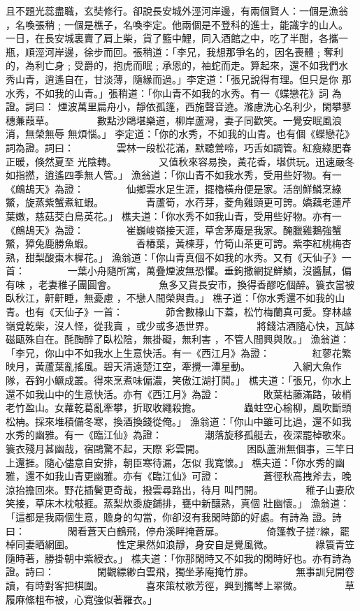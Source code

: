 \begin{pinyinscope}
{且不題光蕊盡職，玄奘修行。卻說長安城外涇河岸邊，有兩個賢人：一個是漁翁
，名喚張稍﹔一個是樵子，名喚李定。他兩個是不登科的進士，能識字的山人。
一日，在長安城裏賣了肩上柴，貨了籃中鯉，同入酒館之中，吃了半酣，各攜一
瓶，順涇河岸邊，徐步而回。張稍道：「李兄，我想那爭名的，因名喪體﹔奪利
的，為利亡身﹔受爵的，抱虎而眠﹔承恩的，袖蛇而走。算起來，還不如我們水
秀山青，逍遙自在，甘淡薄，隨緣而過。」李定道：「張兄說得有理。但只是你
那水秀，不如我的山青。」張稍道：「你山青不如我的水秀。有一《蝶戀花》詞
為證。詞曰：
煙波萬里扁舟小，靜依孤篷，西施聲音遶。滌慮洗心名利少，閑攀蓼穗蒹葭草。
　　　　數點沙鷗堪樂道，柳岸蘆灣，妻子同歡笑。一覺安眠風浪消，無榮無辱
        無煩惱。」
李定道：「你的水秀，不如我的山青。也有個《蝶戀花》詞為證。詞曰：
　　　　雲林一段松花滿，默聽鶯啼，巧舌如調管。紅瘦綠肥春正暖，倏然夏至
        光陰轉。
　　　　又值秋來容易換，黃花香，堪供玩。迅速嚴冬如指撚，逍遙四季無人管。」
漁翁道：「你山青不如我水秀，受用些好物。有一《鷓鴣天》為證：
　　　　仙鄉雲水足生涯，擺櫓橫舟便是家。活剖鮮鱗烹綠鱉，旋蒸紫蟹煮紅蝦。
　　　　青蘆筍，水荇芽，菱角雞頭更可誇。嬌藕老蓮芹葉嫩，慈菇茭白鳥英花。」
樵夫道：「你水秀不如我山青，受用些好物。亦有一《鷓鴣天》為證：
　　　　崔巍峻嶺接天涯，草舍茅庵是我家。醃臘雞鵝強蟹鱉，獐兔鹿勝魚蝦。
　　　　香椿葉，黃楝芽，竹筍山茶更可誇。紫李紅桃梅杏熟，甜梨酸棗木樨花。」
漁翁道：「你山青真個不如我的水秀。又有《天仙子》一首：
　　　　一葉小舟隨所寓，萬疊煙波無恐懼。垂鉤撒網捉鮮鱗，沒醬膩，偏有味
       ，老妻稚子團圓會。
　　　　魚多又貨長安市，換得香醪吃個醉。簑衣當被臥秋江，鼾鼾睡，無憂慮
       ，不戀人間榮與貴。」
樵子道：「你水秀還不如我的山青。也有《天仙子》一首：
　　　　茆舍數椽山下蓋，松竹梅蘭真可愛。穿林越嶺覓乾柴，沒人怪，從我賣
       ，或少或多憑世界。
　　　　將錢沽酒隨心快，瓦缽磁甌殊自在。酕醄醉了臥松陰，無掛礙，無利害
       ，不管人間興與敗。」
漁翁道：「李兄，你山中不如我水上生意快活。有一《西江月》為證：
　　　　紅蓼花繁映月，黃蘆葉亂搖風。碧天清遠楚江空，牽攪一潭星動。
　　　　入網大魚作隊，吞鉤小鱖成叢。得來烹煮味偏濃，笑傲江湖打鬨。」
樵夫道：「張兄，你水上還不如我山中的生意快活。亦有《西江月》為證：
　　　　敗葉枯藤滿路，破梢老竹盈山。女蘿乾葛亂牽攀，折取收繩殺擔。
　　　　蟲蛀空心榆柳，風吹斷頭松柟。採來堆積備冬寒，換酒換錢從俺。」
漁翁道：「你山中雖可比過，還不如我水秀的幽雅。有一《臨江仙》為證：
　　　　潮落旋移孤艇去，夜深罷棹歌來。簑衣殘月甚幽哉，宿鷗驚不起，天際
彩雲開。
　　　　困臥蘆洲無個事，三竿日上還捱。隨心儘意自安排，朝臣寒待漏，怎似
        我寬懷。」
樵夫道：「你水秀的幽雅，還不如我山青更幽雅。亦有《臨江仙》可證：
　　　　蒼徑秋高拽斧去，晚涼抬擔回來。野花插鬢更奇哉，撥雲尋路出，待月
        叫門開。
　　　　稚子山妻欣笑接，草床木枕攲捱。蒸梨炊黍旋鋪排，甕中新釀熟，真個
        壯幽懷。」
漁翁道：「這都是我兩個生意，贍身的勾當，你卻沒有我閑時節的好處。有詩為
        證。詩曰：
　　　　閑看蒼天白鶴飛，停舟溪畔掩蒼扉。
　　　　倚篷教子搓?線，罷棹同妻晒網圍。
　　　　性定果然如浪靜，身安自是覺風微。
　　　　綠簑青笠隨時著，勝掛朝中紫綬衣。」
樵夫道：「你那閑時又不如我的閑時好也。亦有詩為證。詩曰：
　　　　閑觀縹緲白雲飛，獨坐茅庵掩竹扉。
　　　　無事訓兒開卷讀，有時對客把棋圍。
　　　　喜來策杖歌芳徑，興到攜琴上翠微。
　　　　草履麻絛粗布被，心寬強似著羅衣。」

}
\end{pinyinscope}
